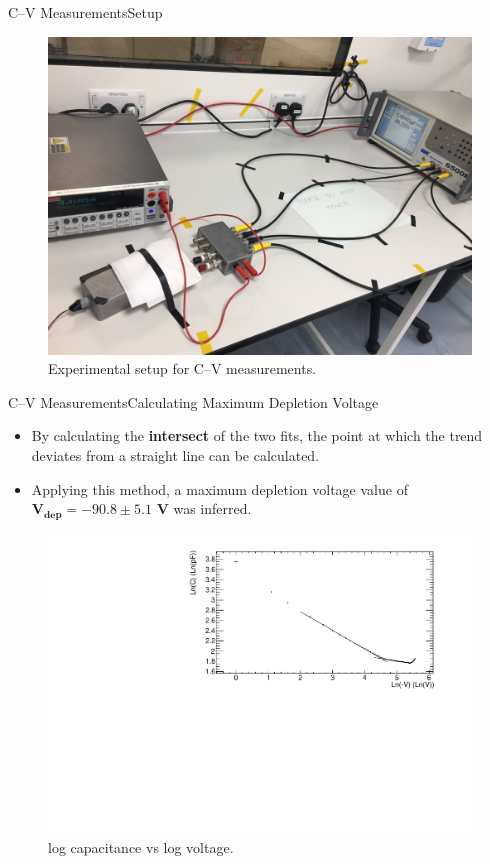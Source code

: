 \documentclass{beamer}
\begin{document}
    \begin{frame}{C--V Measurements}{Setup}
        \begin{figure}
            \centering
            \includegraphics[width = 0.8\linewidth]{CVSetup.jpg}
            \caption{Experimental setup for C--V measurements.}
            \label{fig:CVSetup}
        \end{figure}
    \end{frame}
    
    \begin{frame}{C--V Measurements}{Calculating Maximum Depletion Voltage}
        \begin{itemize}
            \item By calculating the \textbf{intersect} of the two fits, the point at which the trend deviates from a straight line can be calculated.
            \vspace{0.3cm}
            \item Applying this method, a maximum depletion voltage value of $\bm{V_{dep} = -90.8 \pm 5.1}$ \textbf{V} was inferred. 
        \end{itemize}
        \begin{figure}
            \centering
            \includegraphics[width = 0.8\linewidth]{Diode2_nonirradiated_CV_noextrapolation_1711.pdf}
            \vspace{-0.4cm}
            \caption{log capacitance vs log voltage.}
            \label{fig:CVNonIrradiated}
        \end{figure}
    \end{frame}
    
\end{document}
